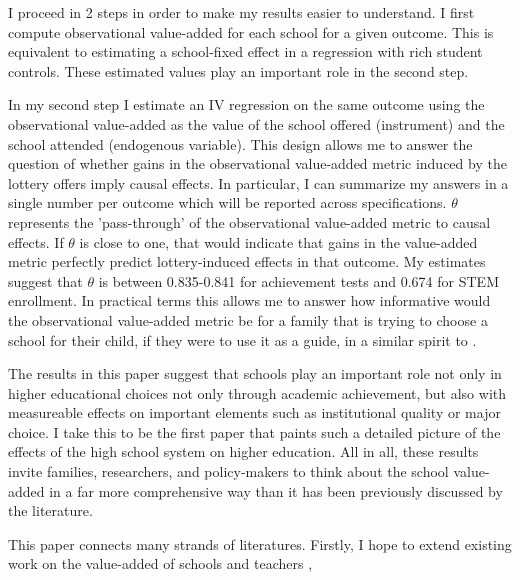 \documentclass[a4paper, article, english, oneside, unknownkeysallowed, 12pt]{memoir}
\begin{document}
I proceed in 2 steps in order to make my results easier to understand. 
I first compute observational value-added for each school for a given outcome. 
This is equivalent to estimating a school-fixed effect in a regression with rich student controls.
These estimated values play an important role in the second step. 

In my second step I estimate an IV regression on the same outcome using the observational value-added as the value of the school offered (instrument) and the school attended (endogenous variable). 
This design allows me to answer the question of whether gains in the observational value-added metric induced by the lottery offers imply causal effects.
In particular, I can summarize my answers in a single number per outcome which will be reported across specifications. 
$\theta$ represents the 'pass-through' of the observational value-added metric to causal effects. 
If $\theta$ is close to one, that would indicate that gains in the value-added metric perfectly predict lottery-induced effects in that outcome. 
My estimates suggest that $\theta$ is between 0.835-0.841 for achievement tests and 0.674 for STEM enrollment. 
In practical terms this allows me to answer how informative would the observational value-added metric be for a family that is trying to choose a school for their child, if they were to use it as a guide, in a similar spirit to \textcite{angrist_leveraging_2017}.





The results in this paper suggest that schools play an important role not only in higher educational choices not only through academic achievement, but also with measureable effects on important elements such as institutional quality or major choice. 
I take this to be the first paper that paints such a detailed picture of the effects of the high school system on higher education. 
All in all, these results invite families, researchers, and policy-makers to think about the school value-added in a far more comprehensive way than it has been previously discussed by the literature.


This paper connects many strands of literatures. 
Firstly, I hope to extend existing work on the value-added of schools and teachers \parencite{chetty_measuring_2014},  

\parencite{dobbie_medium-term_2015, beuermann_what_2023}
\end{document}
